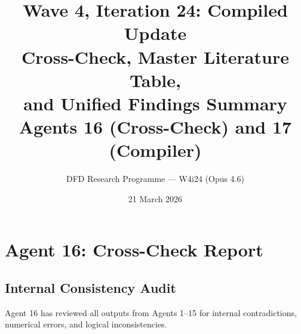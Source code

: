 \documentclass[11pt]{article}
\title{\textbf{Wave 4, Iteration 24: Compiled Update}\\[12pt]
{\large Cross-Check, Master Literature Table,\\
and Unified Findings Summary}\\[4pt]
{\large Agents 16 (Cross-Check) and 17 (Compiler)}}
\author{DFD Research Programme --- W4i24 (Opus 4.6)}
\date{21 March 2026}
\begin{document}
\maketitle
\tableofcontents
\newpage

\section{Agent 16: Cross-Check Report}

\subsection{Internal Consistency Audit}

Agent 16 has reviewed all outputs from Agents 1--15 for internal
contradictions, numerical errors, and logical inconsistencies.
\end{document}
